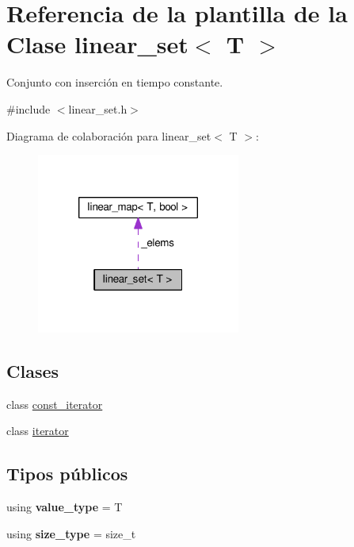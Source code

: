 \hypertarget{classlinear__set}{\section{Referencia de la plantilla de la Clase linear\-\_\-set$<$ T $>$}
\label{classlinear__set}
}


Conjunto con inserción en tiempo constante.  




{\ttfamily \#include $<$linear\-\_\-set.\-h$>$}



Diagrama de colaboración para linear\-\_\-set$<$ T $>$\-:\nopagebreak
\begin{figure}[H]
\begin{center}
\leavevmode
\includegraphics[width=190pt]{classlinear__set__coll__graph}
\end{center}
\end{figure}
\subsection*{Clases}
\begin{DoxyCompactItemize}
\item 
class \hyperlink{classlinear__set_1_1const__iterator}{const\-\_\-iterator}
\item 
class \hyperlink{classlinear__set_1_1iterator}{iterator}
\end{DoxyCompactItemize}
\subsection*{Tipos públicos}
\begin{DoxyCompactItemize}
\item 
\hypertarget{classlinear__set_a3d7088f5ad3d506bc94ad0fa62c40fed}{using {\bfseries value\-\_\-type} = T}\label{classlinear__set_a3d7088f5ad3d506bc94ad0fa62c40fed}

\item 
\hypertarget{classlinear__set_a502855ac3cffe6a33ba8eed857bd14bf}{using {\bfseries size\-\_\-type} = size\-\_\-t}\label{classlinear__set_a502855ac3cffe6a33ba8eed857bd14bf}

\end{DoxyCompactItemize}
